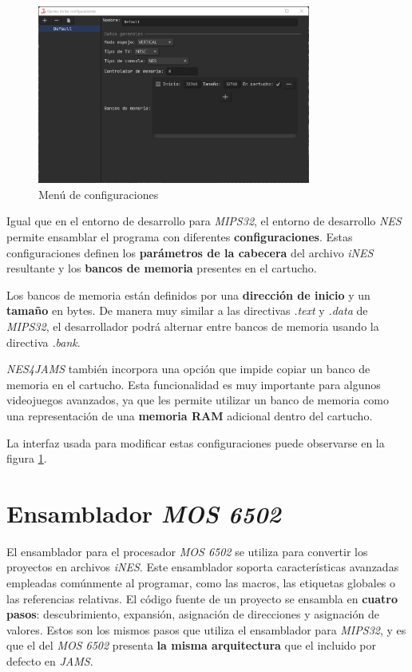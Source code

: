 \begin{figure}[h]
    \centering
    \includegraphics[width=0.8\textwidth]{images/nes/nes-configurations}
    \caption{Menú de configuraciones}
    \label{fig:nes-configurations}
\end{figure}

Igual que en el entorno de desarrollo para \textit{MIPS32},
el entorno de desarrollo \textit{NES} permite ensamblar
el programa con diferentes \textbf{configuraciones}.
Estas configuraciones definen los \textbf{parámetros de la cabecera}
del archivo \textit{iNES} resultante y los \textbf{bancos de memoria}
presentes en el cartucho.

Los bancos de memoria están definidos por una \textbf{dirección de inicio}
y un \textbf{tamaño} en bytes.
De manera muy similar a las directivas \textit{.text}
y \textit{.data} de \textit{MIPS32}, el desarrollador podrá
alternar entre bancos de memoria usando la directiva \textit{.bank}.

\textit{NES4JAMS} también incorpora una opción que impide copiar un
banco de memoria en el cartucho.
Esta funcionalidad es muy importante para algunos videojuegos
avanzados, ya que les permite utilizar un banco de memoria como
una representación de una \textbf{memoria RAM} adicional
dentro del cartucho.

La interfaz usada para modificar estas configuraciones puede observarse
en la figura \ref{fig:nes-configurations}.


\section{Ensamblador \textit{MOS 6502}}\label{sec:ensamblador}

El ensamblador para el procesador \textit{MOS 6502} se utiliza
para convertir los proyectos en archivos \textit{iNES}.
Este ensamblador soporta características avanzadas empleadas
comúnmente al programar, como las macros,
las etiquetas globales o las referencias relativas.
El código fuente de un proyecto se ensambla en \textbf{cuatro pasos}:
descubrimiento, expansión, asignación de direcciones y asignación de valores.
Estos son los mismos pasos que utiliza el ensamblador para \textit{MIPS32},
y es que el del \textit{MOS 6502} presenta \textbf{la misma arquitectura}
que el incluido por defecto en \textit{JAMS}.

